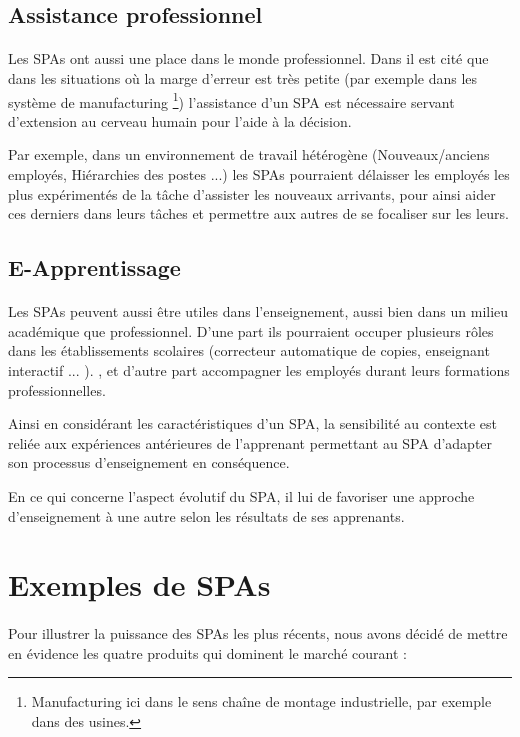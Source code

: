 \subsection{Assistance professionnel}
\paragraph{}
Les SPAs ont aussi une place dans le monde professionnel. Dans \cite{Imtiaz2014} il est cité que dans les situations où la marge d'erreur est très petite (par exemple dans les système de manufacturing \footnote{Manufacturing ici dans le sens chaîne de montage industrielle, par exemple dans des usines.}) l'assistance d'un SPA est nécessaire servant d'extension au cerveau humain pour l'aide à la décision.
\par
Par exemple, dans un environnement de travail hétérogène (Nouveaux/anciens employés, Hiérarchies des postes ...) les SPAs pourraient délaisser les employés les plus expérimentés de la tâche d'assister les nouveaux arrivants, pour ainsi aider ces derniers dans leurs tâches et permettre aux autres de se focaliser sur les leurs.

\subsection{E-Apprentissage}
\paragraph{}
Les SPAs peuvent aussi être utiles dans l'enseignement, aussi  bien dans un milieu académique que professionnel. D'une part ils pourraient occuper plusieurs rôles dans les établissements scolaires (correcteur automatique de copies, enseignant interactif ... ). \cite{ENGAGINGTA}, et d'autre part accompagner les employés durant leurs formations professionnelles.
\par
Ainsi en considérant les caractéristiques d'un SPA, la sensibilité au contexte est reliée aux expériences antérieures de l'apprenant permettant au SPA d'adapter son processus d'enseignement en conséquence.\par  En ce qui concerne l'aspect évolutif du SPA, il lui  de favoriser une approche d'enseignement à une autre selon les résultats de ses apprenants.

\newpage
\section{Exemples de SPAs}
\paragraph{}
Pour illustrer la puissance des SPAs les plus récents, nous avons décidé de mettre en évidence les quatre produits qui dominent le marché courant :

